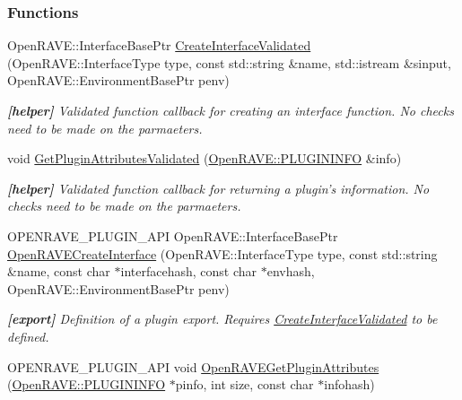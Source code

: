 \subsubsection*{Functions}
\begin{DoxyCompactItemize}
\item 
OpenRAVE::InterfaceBasePtr \hyperlink{group__plugin__exports_ga468c900067e08689383b3f8da642141f}{CreateInterfaceValidated} (OpenRAVE::InterfaceType type, const std::string \&name, std::istream \&sinput, OpenRAVE::EnvironmentBasePtr penv)
\begin{DoxyCompactList}\small\item\em {\bfseries {\bfseries }\mbox{[}helper\mbox{]}} Validated function callback for creating an interface function. No checks need to be made on the parmaeters. \item\end{DoxyCompactList}\item 
void \hyperlink{group__plugin__exports_gaf90c03438b94cc76e7b8a54d445ec106}{GetPluginAttributesValidated} (\hyperlink{classOpenRAVE_1_1PLUGININFO}{OpenRAVE::PLUGININFO} \&info)
\begin{DoxyCompactList}\small\item\em {\bfseries {\bfseries }\mbox{[}helper\mbox{]}} Validated function callback for returning a plugin's information. No checks need to be made on the parmaeters. \item\end{DoxyCompactList}\item 
\hypertarget{group__plugin__exports_ga6251cc7d3b33f6109ca5d346def08370}{
OPENRAVE\_\-PLUGIN\_\-API OpenRAVE::InterfaceBasePtr \hyperlink{group__plugin__exports_ga6251cc7d3b33f6109ca5d346def08370}{OpenRAVECreateInterface} (OpenRAVE::InterfaceType type, const std::string \&name, const char $\ast$interfacehash, const char $\ast$envhash, OpenRAVE::EnvironmentBasePtr penv)}
\label{group__plugin__exports_ga6251cc7d3b33f6109ca5d346def08370}

\begin{DoxyCompactList}\small\item\em {\bfseries \mbox{[}export\mbox{]}} Definition of a plugin export. Requires \hyperlink{group__plugin__exports_ga468c900067e08689383b3f8da642141f}{CreateInterfaceValidated} to be defined. \item\end{DoxyCompactList}\item 
\hypertarget{group__plugin__exports_gafc96682ac1d9ff550d6f95d1837f3dc6}{
OPENRAVE\_\-PLUGIN\_\-API void \hyperlink{group__plugin__exports_gafc96682ac1d9ff550d6f95d1837f3dc6}{OpenRAVEGetPluginAttributes} (\hyperlink{classOpenRAVE_1_1PLUGININFO}{OpenRAVE::PLUGININFO} $\ast$pinfo, int size, const char $\ast$infohash)}
\label{group__plugin__exports_gafc96682ac1d9ff550d6f95d1837f3dc6}


\end{DoxyCompactItemize}
